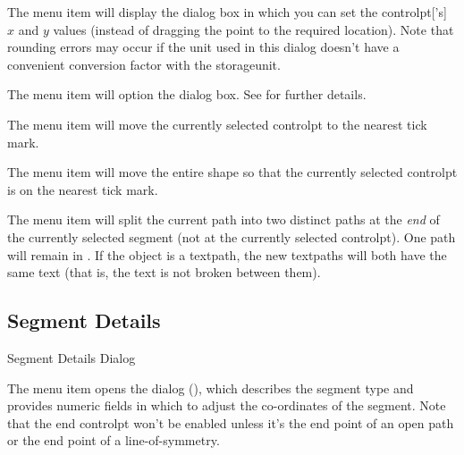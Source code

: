 
The  menu item will display the
 dialog box in which you can set the
\gls{controlpt}['s] $x$ and $y$ values (instead of dragging the
point to the required location).  Note that rounding errors may
occur if the unit used in this dialog doesn't have a convenient
conversion factor with the \gls{storageunit}.


The  menu item will option the 
 dialog box. See 
for further details.


The  menu item will
move the currently selected \gls*{controlpt} to the nearest
tick mark.


The  menu item will move the entire
shape so that the currently selected \gls{controlpt} is on the
nearest tick mark.


The  menu item will split the current path
into two distinct \glspl{path} at the \emph{end} of the currently
selected segment (not at the currently selected \gls*{controlpt}).
One path will remain in \editpathmode. 
If the object is a \gls*{textpath}, the new \glspl*{textpath} will
both have the same text (that is, the text is not broken between
them).

\subsection{Segment Details}\label{sec:segmentinfo}


{}
{Segment Details Dialog}

The  menu item opens the 
dialog (), which describes the segment
type and provides numeric fields in which to adjust the co-ordinates
of the segment. Note that the end \gls{controlpt} won't be enabled
unless it's the end point of an open path or the end point of a
\gls{line-of-symmetry}.

